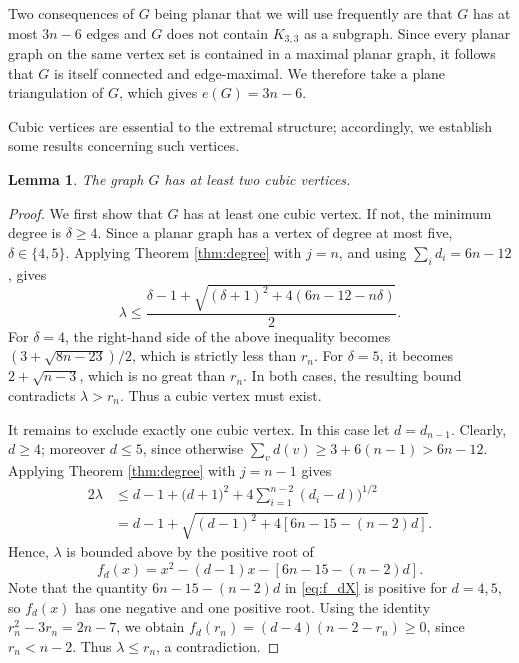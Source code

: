 \documentclass[11pt]{article}
\theoremstyle{plain}
\newtheorem{lemma}{Lemma}[section]
\theoremstyle{definition}
\numberwithin{equation}{section}
\begin{document}
Two consequences of $G$ being planar that we will use frequently are that $G$ has at most $3n-6$ edges and $G$ does not contain $K_{3,3}$ as a subgraph.
Since every planar graph on the same vertex set is contained in a maximal planar graph, 
it follows that $G$ is itself connected and edge-maximal. We therefore take a plane triangulation of 
$G$, which gives $e(G) = 3n - 6$.

Cubic vertices are essential to the extremal structure; accordingly, we establish 
some results concerning such vertices.

\begin{lemma}\label{lem:twoears}
The graph $G$ has at least two cubic vertices.
\end{lemma}

\begin{proof}
We first show that $G$ has at least one cubic vertex. If not, the minimum degree is 
$\delta\geq 4$. Since a planar graph has a vertex of degree at most five, $\delta\in\{4,5\}$.
Applying Theorem \ref{thm:degree} with $j=n$, and using $\sum_i d_i = 6n - 12$, gives
\[
\lambda\leq\frac{\delta - 1 + \sqrt{(\delta + 1)^2 + 4(6n - 12 - n\delta)}}{2}.
\]
For $\delta=4$, the right-hand side of the above inequality becomes
$(3 + \sqrt{8n-23})/2$, which is strictly less than $r_n$.
For $\delta=5$, it becomes $2+\sqrt{n-3}$, which is no great than $r_n$. 
In both cases, the resulting bound contradicts $\lambda > r_n$. Thus a cubic vertex must exist.

It remains to exclude exactly one cubic vertex. In this case let $d=d_{n-1}$. Clearly, $d\geq 4$; 
moreover $d\leq 5$, since otherwise $\sum_vd(v)\geq 3 + 6(n-1) > 6n - 12$. Applying Theorem \ref{thm:degree} 
with $j=n-1$ gives 
\begin{align*}
2\lambda & \leq d-1 +\bigg(d+1)^2 + 4\sum_{i=1}^{n-2} (d_i - d)\bigg)^{1/2} \\
& = d-1 + \sqrt{(d-1)^2 + 4[6n-15-(n-2)d]}.
\end{align*}
Hence, $\lambda$ is bounded above by the positive root of
\begin{equation}\label{eq:f_dX}
 f_d(x) = x^2 - (d - 1) x - [6n - 15 - (n-2) d].
\end{equation}
Note that the quantity $6n - 15 - (n-2) d$ in \eqref{eq:f_dX} is positive for $d=4,5$, 
so $f_d(x)$ has one negative and one positive root. Using the identity $r_n^2-3r_n=2n-7$, we obtain
$f_d(r_n) = (d-4)(n-2-r_n)\geq 0$, since $r_n<n-2$. Thus $\lambda\leq r_n$, a contradiction.
\end{proof}
\end{document}
